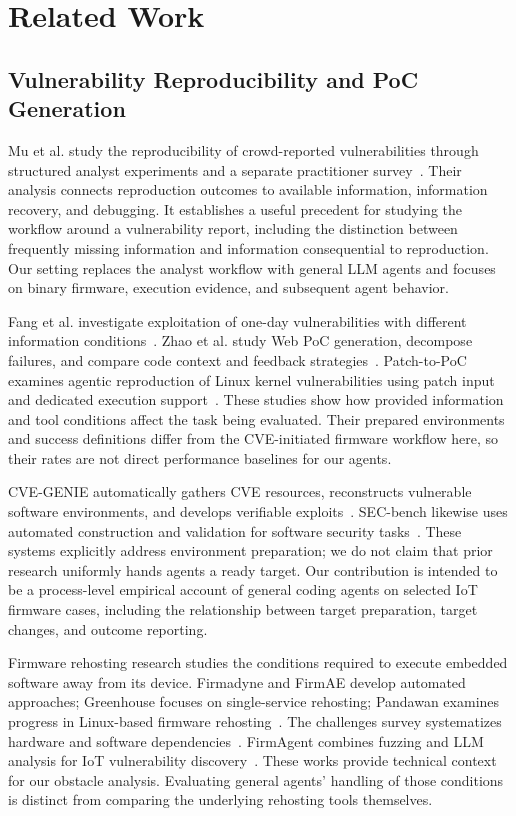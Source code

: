 \section{Related Work}
\label{sec:related}

\subsection{Vulnerability Reproducibility and PoC Generation}

Mu et al. study the reproducibility of crowd-reported vulnerabilities
through structured analyst experiments and a separate practitioner
survey~\cite{mu2018crowdrepro}. Their analysis connects reproduction
outcomes to available information, information recovery, and debugging.
It establishes a useful precedent for studying the workflow around a
vulnerability report, including the distinction between frequently
missing information and information consequential to reproduction. Our
setting replaces the analyst workflow with general LLM agents and focuses
on binary firmware, execution evidence, and subsequent agent behavior.

Fang et al. investigate exploitation of one-day vulnerabilities with
different information conditions~\cite{fang2024oneday}. Zhao et al. study
Web PoC generation, decompose failures, and compare code context and
feedback strategies~\cite{zhao2025webpocstudy}. Patch-to-PoC examines
agentic reproduction of Linux kernel vulnerabilities using patch input
and dedicated execution support~\cite{krepro}. These studies show how
provided information and tool conditions affect the task being evaluated.
Their prepared environments and success definitions differ from the
CVE-initiated firmware workflow here, so their rates are not direct
performance baselines for our agents.

CVE-GENIE automatically gathers CVE resources, reconstructs vulnerable
software environments, and develops verifiable exploits~\cite{cvegenie}.
SEC-bench likewise uses automated construction and validation for software
security tasks~\cite{secbench}. These systems explicitly address
environment preparation; we do not claim that prior research uniformly
hands agents a ready target. Our contribution is intended to be a
process-level empirical account of general coding agents on selected IoT
firmware cases, including the relationship between target preparation,
target changes, and outcome reporting.

Firmware rehosting research studies the conditions required to execute
embedded software away from its device. Firmadyne and FirmAE develop
automated approaches; Greenhouse focuses on single-service rehosting;
Pandawan examines progress in Linux-based firmware
rehosting~\cite{firmadyne,firmae,greenhouse,pandawan}. The challenges
survey systematizes hardware and software dependencies~\cite{challenges}.
FirmAgent combines fuzzing and LLM analysis for IoT vulnerability
discovery~\cite{firmagent}. These works provide technical context for our
obstacle analysis. Evaluating general agents' handling of those conditions
is distinct from comparing the underlying rehosting tools themselves.

